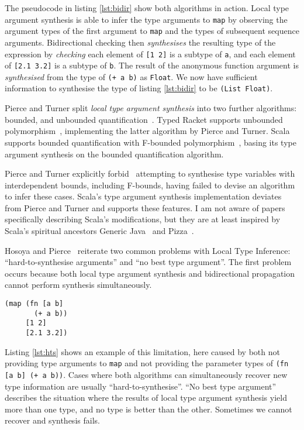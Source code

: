 The pseudocode in listing \ref{lst:bidir} show both algorithms in action. Local type argument synthesis is able
to infer the type arguments to \lstinline|map| by observing the argument types of the first
argument to \lstinline|map| and the types of subsequent sequence arguments. Bidirectional checking
then \emph{synthesises} the resulting type of the expression by \emph{checking} each element
of \lstinline|[1 2]| is a subtype of \lstinline|a|, and each element of \lstinline|[2.1 3.2]| is a subtype of
\lstinline|b|. The result of the anonymous function argument is \emph{synthesised} from the type of
\lstinline|(+ a b)| as \lstinline|Float|. We now have sufficient information to 
synthesise the type of listing \ref{lst:bidir} to be \lstinline|(List Float)|.

Pierce and Turner split \emph{local type argument synthesis} into two further
algorithms: bounded, and unbounded quantification~\cite{PT00}. 
Typed Racket 
supports unbounded polymorphism~\cite{Tob10}, implementing the latter algorithm by Pierce and Turner.
Scala supports bounded quantification with F-bounded polymorphism~\cite{CCHOM89},
basing its type argument synthesis on the bounded quantification algorithm.

Pierce and Turner explicitly forbid~\cite{PT00}
attempting to synthesise type variables with interdependent bounds, including
F-bounds, having failed to devise an algorithm to infer these cases.
Scala's type argument synthesis implementation deviates from Pierce and Turner and supports these features.
I am not aware of papers specifically describing Scala's modifications, but they are at least inspired by
Scala's spiritual ancestors Generic Java~\cite{BOSW98} and Pizza~\cite{OW97}.

Hosoya and Pierce~\cite{HP99} reiterate two common problems with Local Type Inference:
``hard-to-synthesise arguments'' and ``no best type argument''. The first problem occurs because
both local type argument synthesis and bidirectional propagation cannot perform synthesis
simultaneously. 

\begin{lstlisting}[caption=Hard-to-synthesise expression, label=lst:hts]
(map (fn [a b] 
       (+ a b)) 
     [1 2] 
     [2.1 3.2])
\end{lstlisting}

Listing \ref{lst:hts} shows an example of this limitation,
here caused by both not providing type arguments to \lstinline|map| and not providing the parameter types of \lstinline|(fn [a b] (+ a b))|.
 Cases where both algorithms can simultaneously recover new type information are usually ``hard-to-synthesise''.
``No best type argument'' describes the situation where the results of local
type argument synthesis yield more than one type, and no type is better than the other. Sometimes we cannot recover and synthesis
fails.

